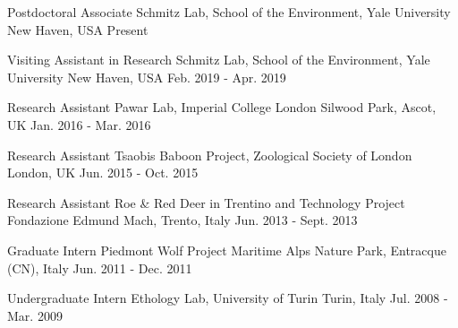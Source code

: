 

\begin{cventries}

  \cventry
    {Postdoctoral Associate} %
    {Schmitz Lab, School of the Environment, Yale University} %
    {New Haven, USA} %
    {Present} %
    {
    }

  \cventry
    {Visiting Assistant in Research} %
    {Schmitz Lab, School of the Environment, Yale University} %
    {New Haven, USA} %
    {Feb. 2019 - Apr. 2019} %
    {
    }

  \cventry
    {Research Assistant} %
    {Pawar Lab, Imperial College London} %
    {Silwood Park, Ascot, UK} %
    {Jan. 2016 - Mar. 2016} %
    {
    }

  \cventry
    {Research Assistant} %
    {Tsaobis Baboon Project, Zoological Society of London} %
    {London, UK} %
    {Jun. 2015 - Oct. 2015} %
    {
    }

  \cventry
    {Research Assistant} %
    {Roe \& Red Deer in Trentino and Technology Project} %
    {Fondazione Edmund Mach, Trento, Italy} %
    {Jun. 2013 - Sept. 2013} %
    {
    }

  \cventry
    {Graduate Intern} %
    {Piedmont Wolf Project} %
    {Maritime Alps Nature Park, Entracque (CN), Italy} %
    {Jun. 2011 - Dec. 2011} %
    {
    }

  \cventry
    {Undergraduate Intern} %
    {Ethology Lab, University of Turin} %
    {Turin, Italy} %
    {Jul. 2008 - Mar. 2009} %
    {
    }

\end{cventries}
